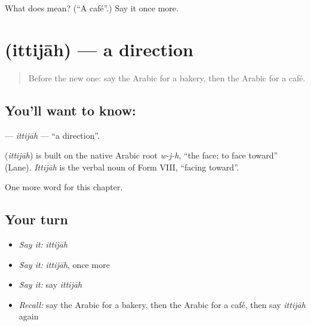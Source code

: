 \begin{tcolorbox}[breakable,colback=teal!4,colframe=teal!35!black,title={Before you move on}]
What does  mean? (\textquotedblleft{}A café\textquotedblright{}.) Say it once more.
\end{tcolorbox}
\section[\texorpdfstring{\ar{اتجاه} (ittijāh)}{اتجاه (ittijāh)}]{ (ittijāh) — a direction}

\label{lesson:AR-C172-ittijah}



\begin{quote}
Before the new one: say the Arabic for a bakery, then the Arabic for a café.
\end{quote}

\subsection*{You'll want to know: }
\textbf{} — \emph{ittijāh} — \textquotedblleft{}a direction\textquotedblright{}.

\begin{cousinweb}
\textbf{} (\emph{ittijāh}) is built on the native Arabic root \emph{w-j-h}, \textquotedblleft{}the face; to face toward\textquotedblright{} (Lane). \emph{Ittijāh} is the verbal noun of Form VIII, \textquotedblleft{}facing toward\textquotedblright{}.
\end{cousinweb}

\begin{grammarlens}[title={What you've built}]
One more word for this chapter.
\end{grammarlens}

\subsection*{Your turn}
\begin{itemize}
\raggedright
  \item \emph{Say it:} \emph{ittijāh}
  \item \emph{Say it:} \emph{ittijāh}, once more
  \item \emph{Say it:} say \emph{ittijāh}
  \item \emph{Recall:} say the Arabic for a bakery, then the Arabic for a café, then say \emph{ittijāh} again
\end{itemize}

